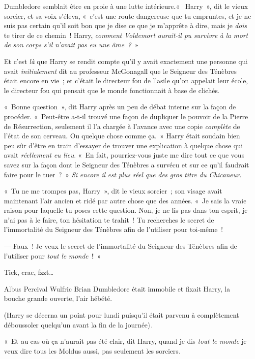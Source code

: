 Dumbledore semblait être en proie à une lutte intérieure.«~ Harry~», dit le vieux sorcier, et sa voix s'éleva, «~c'est une route dangereuse que tu empruntes, et je ne suis pas certain qu'il soit bon que je dise ce que je m'apprête à dire, mais je \emph{dois} te tirer de ce chemin~!
Harry, \emph{comment Voldemort aurait-il pu survivre à la mort de son corps s'il n'avait pas eu une âme~?}~»

Et c'est \emph{là} que Harry se rendit compte qu'il y avait exactement une personne qui avait \emph{initialement} dit au professeur McGonagall que le Seigneur des Ténèbres était encore en vie~; et c'était le directeur fou de l'asile qu'on appelait leur école, le directeur fou qui pensait que le monde fonctionnait à base de clichés.

«~Bonne question~», dit Harry après un peu de débat interne sur la façon de procéder.
«~Peut-être a-t-il trouvé une façon de dupliquer le pouvoir de la Pierre de Résurrection, seulement il l'a chargée à l'avance avec une copie \emph{complète} de l'état de son cerveau.
Ou quelque chose comme ça.~»
Harry était soudain bien peu sûr d'être en train d'essayer de trouver une explication à quelque chose qui avait \emph{réellement eu lieu}.
«~En fait, pourriez-vous juste me dire tout ce que vous savez sur la façon dont le Seigneur des Ténèbres a survécu et sur ce qu'il faudrait faire pour le tuer~?~»
\emph{Si encore il est plus réel que des gros titre du Chicaneur}.

«~Tu ne me trompes pas, Harry~», dit le vieux sorcier~; son visage avait maintenant l'air ancien et ridé par autre chose que des années.
«~Je sais la vraie raison pour laquelle tu poses cette question.
Non, je ne lis pas dans ton esprit, je n'ai pas à le faire, ton hésitation te trahit~!
Tu recherches le secret de l'immortalité du Seigneur des Ténèbres afin de l'utiliser pour toi-même~!

--- Faux~!
Je veux le secret de l'immortalité du Seigneur des Ténèbres afin de l'utiliser pour \emph{tout le monde}~!~»

\later

Tick, crac, fzzt…

Albus Percival Wulfric Brian Dumbledore était immobile et fixait Harry, la bouche grande ouverte, l'air hébété.

(Harry se décerna un point pour lundi puisqu'il était parvenu à complètement déboussoler quelqu'un avant la fin de la journée).

«~Et au cas où ça n'aurait pas été clair, dit Harry, quand je dis \emph{tout le monde} je veux dire tous les Moldus aussi, pas seulement les sorciers.

